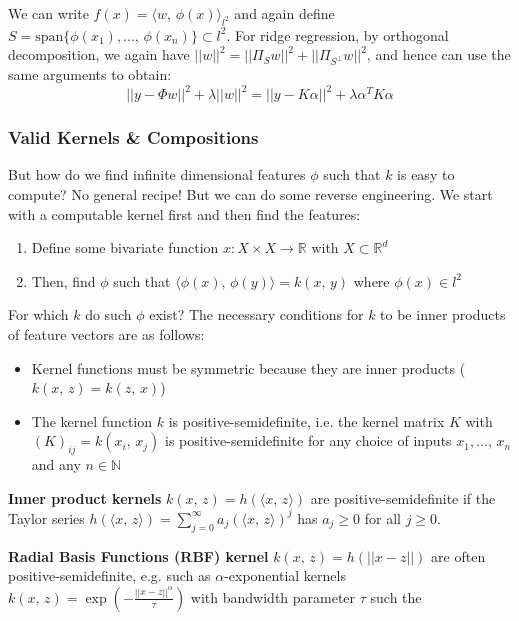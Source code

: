 \documentclass[a4paper]{extarticle}
\begin{document}
We can write $f(x) = \langle w, \, \phi(x) \rangle_{l^2}$ and again define $S = \text{span}\{\phi(x_1),..., \, \phi(x_n)\} \subset l^2$. For ridge regression, by orthogonal decomposition, we again have $||w||^2 = ||\Pi_Sw||^2 + ||\Pi_{S^{\bot}}w||^2$, and hence can use the same arguments to obtain:
\[
    ||y - \Phi w||^2 + \lambda ||w||^2 = ||y - K \alpha||^2 + \lambda \alpha^TK \alpha
\]

\subsubsection{Valid Kernels \& Compositions}

But how do we find infinite dimensional features $\phi$ such that $k$ is easy to compute? No general recipe! But we can do some reverse engineering. We start with a computable kernel first and then find the features:

\begin{enumerate}
    \item Define some bivariate function $x : X \times X \to \mathbb{R}$ with $X \subset \mathbb{R}^d$
    \item Then, find $\phi$ such that $\langle \phi (x), \, \phi(y) \rangle = k(x, \, y)$ where $\phi(x) \in l^2$
\end{enumerate}

For which $k$ do such $\phi$ exist? The necessary conditions for $k$ to be inner products of feature vectors are as follows:

\begin{itemize}
    \item Kernel functions must be symmetric because they are inner products ($k(x, \, z) = k(z, \, x)$)
    \item The kernel function $k$ is positive-semidefinite, i.e. the kernel matrix $K$ with $(K)_{ij} = k(x_i, \, x_j)$ is positive-semidefinite for any choice of inputs $x_1,..., \, x_n$ and any $n \in \mathbb{N}$
\end{itemize}

\textbf{Inner product kernels} $k(x, \, z) = h(\langle x, \, z \rangle)$ are positive-semidefinite if the Taylor series $h(\langle x, \, z \rangle) = \sum_{j = 0}^{\infty} a_j (\langle x, \, z \rangle)^j$ has $a_j \geq 0$ for all $j \geq 0$.

\textbf{Radial Basis Functions (RBF) kernel} $k(x, \, z) = h(||x - z||)$ are often positive-semidefinite, e.g. such as $\alpha$-exponential kernels $k(x, \, z) = \exp(- \frac{||x-z||^{\alpha}}{\tau})$ with bandwidth parameter $\tau$ such the
\end{document}
